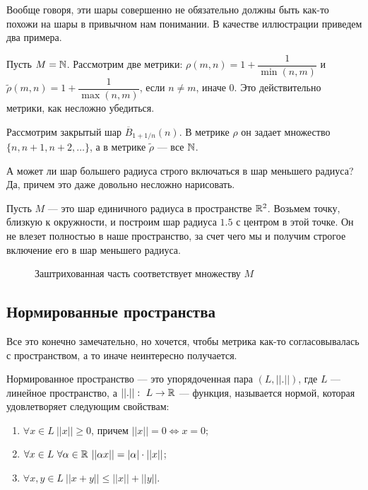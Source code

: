 Вообще говоря, эти шары совершенно не обязательно должны быть как-то похожи на шары в привычном нам понимании. В качестве иллюстрации приведем два примера.
\begin{Examples}
Пусть $M = \mathbb{N}$. Рассмотрим две метрики: $\rho(m, n) = 1 + \dfrac{1}{\min(n, m)}$ и $\widetilde{\rho}(m, n) = 1 + \dfrac{1}{\max(n, m)}$, если $n \neq m$, иначе 0. Это действительно метрики, как несложно убедиться.

Рассмотрим закрытый шар $\overline{B}_{1 + 1/n}(n)$. В метрике $\rho$ он задает множество $\{n, n+1, n+2, \ldots\}$, а в метрике $\widetilde{\rho}$ --- все $\mathbb{N}$. 
\end{Examples}

\begin{Examples}
А может ли шар большего радиуса строго включаться в шар меньшего радиуса? Да, причем это даже довольно несложно нарисовать.

Пусть $M$ --- это шар единичного радиуса в пространстве $\mathbb{R}^2$. Возьмем точку, близкую к окружности, и построим шар радиуса $1.5$ с центром в этой точке. Он не влезет полностью в наше пространство, за счет чего мы и получим строгое включение его в шар меньшего радиуса.
\begin{figure}[H]
\center{\texttt{[image: 14-1]} }
\caption{Заштрихованная часть соответствует множеству $M$}
\end{figure}
\end{Examples}

\subsection{Нормированные пространства}
Все это конечно замечательно, но хочется, чтобы метрика как-то согласовывалась с пространством, а то иначе неинтересно получается.

\begin{Def}
Нормированное пространство --- это упорядоченная пара $(L, ||.||)$, где $L$ --- линейное пространство, а $||.||:\ L \to \mathbb{R}$ --- функция, называется нормой, которая удовлетворяет следующим свойствам:
\begin{enumerate}
\item $\forall x \in L\ ||x|| \geq 0$, причем $||x|| = 0 \Leftrightarrow x = 0$;
\item $\forall x \in L\ \forall \alpha \in \mathbb{R}\ ||\alpha x|| = |\alpha|\cdot ||x||$;
\item $\forall x, y \in L\ ||x + y|| \leq ||x|| + ||y||$.
\end{enumerate}
\end{Def}


